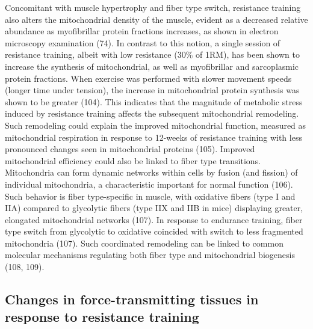 \documentclass[twoside,10pt]{gihclass} %
\begin{document}
Concomitant with muscle hypertrophy and fiber type switch, resistance training also alters the mitochondrial density of the muscle, evident as a decreased relative abundance as myofibrillar protein fractions increases, as shown in electron microscopy examination
(74).
In contrast to this notion, a single session of resistance training, albeit with low resistance (30\% of 1RM), has been shown to increase the synthesis of mitochondrial, as well as myofibrillar and sarcoplasmic protein fractions. When exercise was performed with slower movement speeds (longer time under tension), the increase in mitochondrial protein synthesis was shown to be greater
(104).
This indicates that the magnitude of metabolic stress induced by resistance training affects the subsequent mitochondrial remodeling.
Such remodeling could explain the improved mitochondrial function, measured as mitochondrial respiration in response to 12-weeks of resistance training with less pronounced changes seen in mitochondrial proteins
(105).
Improved mitochondrial efficiency could also be linked to fiber type transitions.
Mitochondria can form dynamic networks within cells by fusion (and fission) of individual mitochondria, a characteristic important for normal function
(106).
Such behavior is fiber type-specific in muscle, with oxidative fibers (type I and IIA) compared to glycolytic fibers (type IIX and IIB in mice) displaying greater, elongated mitochondrial networks
(107).
In response to endurance training, fiber type switch from glycolytic to oxidative coincided with switch to less fragmented mitochondria
(107).
Such coordinated remodeling can be linked to common molecular mechanisms regulating both fiber type and mitochondrial biogenesis
(108, 109).

\hypertarget{changes-in-force-transmitting-tissues-in-response-to-resistance-training}{%
\subsection{Changes in force-transmitting tissues in response to resistance training}\label{changes-in-force-transmitting-tissues-in-response-to-resistance-training}}
\end{document}
